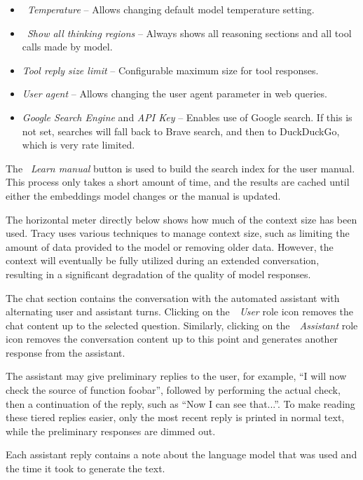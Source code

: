 \documentclass[hidelinks,titlepage,a4paper,twoside]{article}
\begin{document}
\begin{itemize}
\begin{itemize}
\item \emph{\faTemperatureHalf{}~Temperature} -- Allows changing default model temperature setting.
\item \emph{\faLightbulb{}~Show all thinking regions} -- Always shows all reasoning sections and all tool calls made by model.
\item \emph{Tool reply size limit} -- Configurable maximum size for tool responses.
\item \emph{User agent} -- Allows changing the user agent parameter in web queries.
\item \emph{Google Search Engine} and \emph{API Key} -- Enables use of Google search. If this is not set, searches will fall back to Brave search, and then to DuckDuckGo, which is very rate limited.
\end{itemize}
\end{itemize}

The \emph{\faBook{}~Learn manual} button is used to build the search index for the user manual. This process only takes a short amount of time, and the results are cached until either the embeddings model changes or the manual is updated.

The horizontal meter directly below shows how much of the context size has been used. Tracy uses various techniques to manage context size, such as limiting the amount of data provided to the model or removing older data. However, the context will eventually be fully utilized during an extended conversation, resulting in a significant degradation of the quality of model responses.

The chat section contains the conversation with the automated assistant with alternating user and assistant turns. Clicking on the~\emph{\faUser{}~User} role icon removes the chat content up to the selected question. Similarly, clicking on the~\emph{\faRobot{}~Assistant} role icon removes the conversation content up to this point and generates another response from the assistant.

The assistant may give preliminary replies to the user, for example, \enquote{I will now check the source of function foobar}, followed by performing the actual check, then a continuation of the reply, such as \enquote{Now I can see that...}. To make reading these tiered replies easier, only the most recent reply is printed in normal text, while the preliminary responses are dimmed out.

Each assistant reply contains a note about the language model that was used and the time it took to generate the text.
\end{document}
